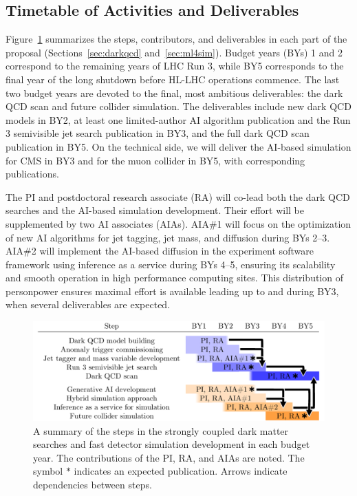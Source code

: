 \subsection{Timetable of Activities and Deliverables}

Figure~\ref{fig:activities} summarizes the steps, contributors, and deliverables in each part of the proposal (Sections~\ref{sec:darkqcd} and~\ref{sec:ml4sim}).
Budget years (BYs) 1 and 2 correspond to the remaining years of LHC Run 3, while BY5 corresponds to the final year of the long shutdown before HL-LHC operations commence.
The last two budget years are devoted to the final, most ambitious deliverables: the dark QCD scan and future collider simulation.
The deliverables include new dark QCD models in BY2, at least one limited-author AI algorithm publication and the Run 3 semivisible jet search publication in BY3, and the full dark QCD scan publication in BY5.
On the technical side, we will deliver the AI-based simulation for CMS in BY3 and for the muon collider in BY5, with corresponding publications.

The PI and postdoctoral research associate (RA) will co-lead both the dark QCD searches and the AI-based simulation development.
Their effort will be supplemented by two AI associates (AIAs).
AIA\#1 will focus on the optimization of new AI algorithms for jet tagging, jet mass, and diffusion during BYs 2--3.
AIA\#2 will implement the AI-based diffusion in the experiment software framework using inference as a service during BYs 4--5, ensuring its scalability and smooth operation in high performance computing sites.
This distribution of personpower ensures maximal effort is available leading up to and during BY3, when several deliverables are expected.

\begin{figure}[htb!]
\centering
\includegraphics[width=0.95\myfigurewidth]{figures/table_final.pdf}
\caption{A summary of the steps in the strongly coupled dark matter searches and fast detector simulation development in each budget year. The contributions of the PI, RA, and AIAs are noted. The symbol $\ast$ indicates an expected publication. Arrows indicate dependencies between steps.}
\label{fig:activities}
\end{figure}

\clearpage
